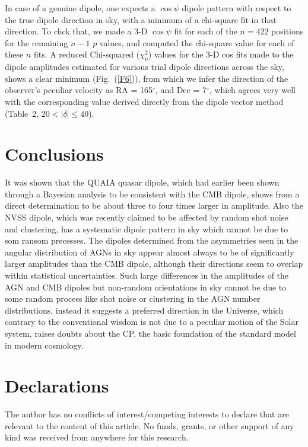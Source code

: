 \documentclass[fleqn,usenatbib]{mnras}
\begin{document}
In case of a genuine dipole, one expects a  $\cos\psi$ dipole pattern with respect to the true dipole direction in sky, with a minimum of a  chi-square fit in that direction. To chck that, we made a 3-D $\cos\psi$ fit for each of the $n=422$ positions for the remaining $n-1$ $p$ values, and computed the chi-square value for each of these $n$ fits. 
 A reduced Chi-squared ($\chi^2_\nu$) values for the 3-D  cos fits  made to the dipole amplitudes estimated for various trial dipole directions across the sky, shows a clear minimum  (Fig.~(\ref{F6})), from which we infer the direction of the observer's peculiar velocity as RA = 165$^{\circ}$, and Dec = 7$^{\circ}$, which agrees very well with the corresponding value  derived directly from the dipole vector method (Table~2, $20<|{\delta}|\leq40$).

\section{Conclusions}
It was shown that the QUAIA quasar dipole, which had earlier been shown through a Bayesian analysis to be consistent with the CMB dipole, shows from a direct determination to be about three to four times larger in amplitude. Also the NVSS dipole, which was recently claimed to be affected by random shot noise and clustering, has a systematic dipole pattern in sky which cannot be due to som ransom precesses.  The dipoles determined from the asymmetries seen in the angular distribution of AGNs in sky appear almost always to be of significantly larger amplitudes than the CMB dipole, although their directions seem to overlap  within statistical uncertainties. Such large differences in the amplitudes of the AGN and CMB dipoles but non-random orientations in sky cannot be due to some random process like shot noise or clustering in the AGN number distributions, instead it  suggests a preferred direction in the Universe, which contrary to the conventional wisdom is not due to a peculiar motion of the Solar system, raises doubts about the CP, the basic foundation of the standard model in modern cosmology.
\section*{Declarations}
The author has no conflicts of interest/competing interests to declare that are relevant to the content of this article. No funds, grants, or other support of any kind was received from anywhere for this research.
\end{document}
